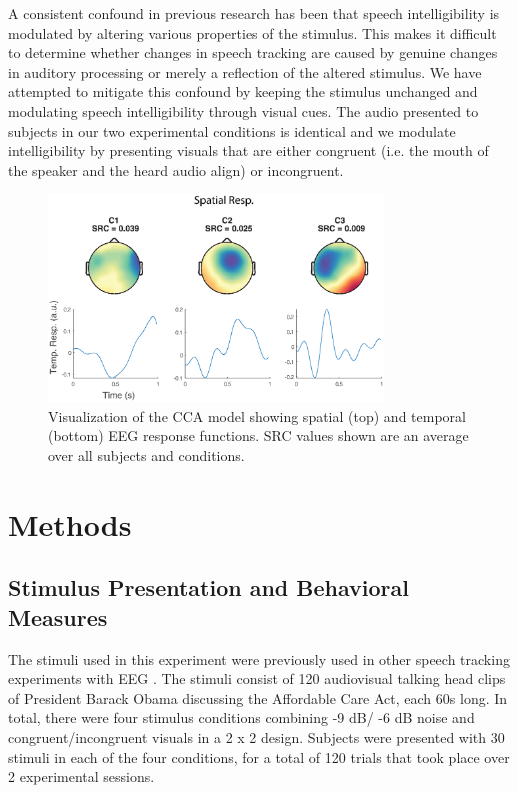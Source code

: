 \documentclass[10pt,letterpaper]{article}
\begin{document}
A consistent 
confound in previous research has been that speech intelligibility is 
modulated by altering various properties of the stimulus. This makes
it difficult to determine whether changes in speech tracking are 
caused by genuine changes in auditory processing or merely a reflection of the
altered stimulus. We have attempted to mitigate this confound by keeping 
the stimulus unchanged and modulating speech intelligibility through 
visual cues. The audio presented to subjects in our two experimental conditions
is identical and we modulate intelligibility by presenting visuals that 
are either congruent (i.e. the mouth of the speaker and the heard audio align)
or incongruent.

\begin{figure}[h]
  \begin{center}
    \includegraphics[width=\columnwidth,height=5.5cm]{Figure3a}
  \end{center}
  \caption{Visualization of the CCA model showing spatial (top)
  and temporal (bottom) EEG response functions. SRC values shown
  are an average over all subjects and conditions.}
  \label{srcModel}
\end{figure}



\section{Methods}

\subsection{Stimulus Presentation and Behavioral Measures}

  The stimuli used in this experiment were previously used in other 
  speech tracking experiments with EEG \cite{Crosse2015,Crosse2016}.
  The stimuli consist of 120 audiovisual talking head clips of President
  Barack Obama discussing the Affordable Care Act, each 60s long. In total, 
  there were four stimulus conditions combining -9 dB/ -6 dB noise and 
  congruent/incongruent visuals in a 2 x 2 design. Subjects were presented
  with 30 stimuli in each of the four conditions, for a total of 120
  trials that took place over 2 experimental sessions.
\end{document}
